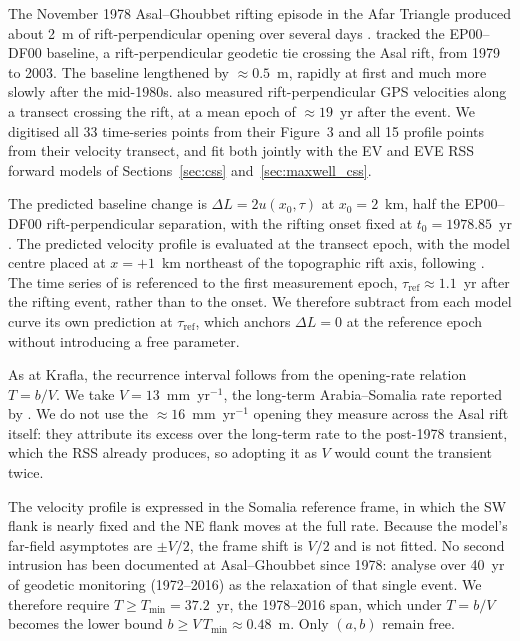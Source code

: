 \documentclass[extra]{gji}
\begin{document}
The November 1978 Asal--Ghoubbet rifting episode in the Afar Triangle produced
about 2~m of rift-perpendicular opening over several days \citep{ledain1979seismotectonic,ruegg1984seismotectonic}.  \citet{vigny2007twenty}
tracked the EP00--DF00 baseline, a rift-perpendicular geodetic tie crossing
the Asal rift, from 1979 to 2003.  The baseline lengthened by
$\approx0.5$~m, rapidly at first and much more slowly after the
mid-1980s.  \citet{vigny2007twenty} also measured rift-perpendicular GPS
velocities along a transect crossing the rift, at a mean epoch of
$\approx19$~yr after the event.  We digitised all 33 time-series points
from their Figure~3 and all 15 profile points from their velocity
transect, and fit both jointly with the EV and EVE RSS forward models of
Sections~\ref{sec:css} and~\ref{sec:maxwell_css}.

The predicted baseline
change is $\Delta L = 2u(x_0,\tau)$ at $x_0 = 2$~km, half the EP00--DF00
rift-perpendicular separation, with the rifting onset fixed at
$t_0 = 1978.85$~yr \citep{vigny2007twenty}.  The predicted velocity profile
is evaluated at the transect epoch, with the model centre placed at
$x=+1$~km northeast of the topographic rift axis, following
\citet{vigny2007twenty}.  The time series of \citet{vigny2007twenty} is
referenced to the first measurement epoch, $\tau_{\mathrm{ref}} \approx
1.1$~yr after the rifting event, rather than to the onset.  We therefore
subtract from each model curve its own prediction at $\tau_{\mathrm{ref}}$,
which anchors $\Delta L = 0$ at the reference epoch without introducing a
free parameter.

As at Krafla, the recurrence interval follows from the opening-rate
relation $T = b/V$.  We take
$V = 13$~mm~yr$^{-1}$, the long-term Arabia--Somalia rate reported by
\citet{vigny2007twenty}.  We do not use the $\approx16$~mm~yr$^{-1}$ opening
they measure across the Asal rift itself: they attribute its excess over
the long-term rate to the post-1978 transient, which the RSS already produces,
so adopting it as $V$ would count the transient twice.

The velocity
profile is expressed in the Somalia reference frame, in which the SW flank
is nearly fixed and the NE flank moves at the full rate.  Because the
model's far-field asymptotes are $\pm V/2$, the frame shift is $V/2$ and
is not fitted.  No second intrusion has been
documented at Asal--Ghoubbet since 1978: \citet{smittarello2016transient}
analyse over 40~yr of geodetic monitoring (1972--2016) as the relaxation of
that single event.  We therefore require $T \geq T_{\min} = 37.2$~yr, the
1978--2016 span, which under $T = b/V$ becomes the lower bound
$b \geq V\,T_{\min} \approx 0.48$~m.  Only $(a,b)$ remain free.
\end{document}
